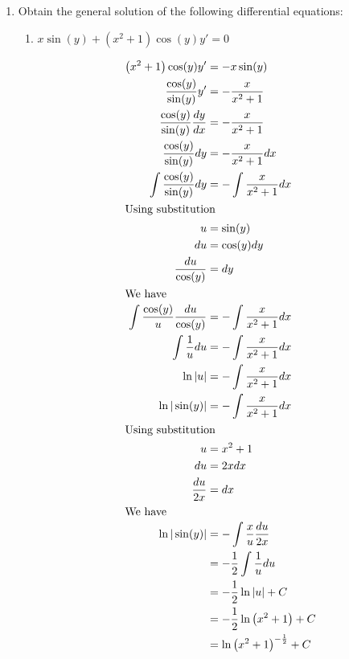 \documentclass{zc-ust-hw}
\begin{document}
\maketitle

\begin{enumerate}
  \item Obtain the general solution of the following differential equations:
    \begin{enumerate}
      \item $x \sin (y)+\left(x^2+1\right) \cos (y) y'=0$
        \begin{sol}
          \begin{align}
            \left(x^2+1\right) \cos (y) y'&=-x \sin (y) \\
            \frac{\cos(y)}{\sin(y)} y'&=-\frac{x}{x^2+1} \\
            \frac{\cos(y)}{\sin(y)} \frac{dy}{dx}&=-\frac{x}{x^2+1} \\
            \frac{\cos(y)}{\sin(y)} dy &=-\frac{x}{x^2+1} dx \\
            \int \frac{\cos(y)}{\sin(y)} dy &=-\int \frac{x}{x^2+1} dx \\
            \intertext{Using substitution}
            u&=\sin(y)\\
            du&=\cos(y) dy\\
            \frac{du}{\cos(y)}&= dy\\
            \intertext{We have}
            \int \frac{\cos (y)}{u} \frac{du}{\cos(y)}&=-\int \frac{x}{x^2+1} dx\\
            \int \frac{1}{u}du&=-\int \frac{x}{x^2+1} dx\\
            \ln |u|&=-\int \frac{x}{x^2+1} dx\\
            \ln |\sin(y)|&=-\int \frac{x}{x^2+1} dx\\
            \intertext{Using substitution}
            u&=x^2+1\\
            du&=2x dx\\
            \frac{du}{2x}&=dx\\
            \intertext{We have}
            \ln |\sin(y)|&=-\int \frac{x}{u} \frac{du}{2x}\\
                         &=-\frac{1}{2}\int \frac{1}{u} du\\
                         &=-\frac{1}{2}\ln |u|+C\\
                         &=-\frac{1}{2}\ln \left( x^2+1 \right) +C\\
                         &=\ln \left(x^2+1 \right)^{-\frac{1}{2}}   +C\\

\end{align}
\end{sol}
\end{enumerate}
\end{enumerate}
\end{document}
